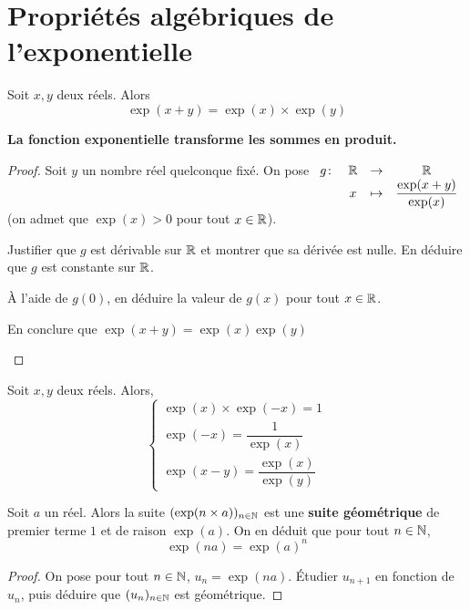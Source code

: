 \documentclass{poly}
\begin{document}
\section{Propriétés algébriques de l'exponentielle}
\begin{theorem}
Soit $x,y$ deux réels. Alors
\begin{equation*}
\exp(x + y) = \exp(x) \times \exp(y)
\end{equation*}
\end{theorem}
\begin{remark}
\textbf{La fonction exponentielle transforme les sommes en produit.}
\end{remark}
\begin{proof}
Soit $y$ un nombre réel quelconque fixé. On pose $\begin{array}[t]{lccc} g \colon &\mathbb{R} &\to& \mathbb{R}\\ & x &\mapsto& \dfrac{\exp(x + y)}{\exp(x)}\end{array}$ (on admet que $\exp(x) > 0$ pour tout $x \in \mathbb{R}$).
\begin{alphaquestions}
\item Justifier que $g$ est dérivable sur $\mathbb{R}$ et montrer que sa dérivée est nulle. En déduire que $g$ est constante sur $\mathbb{R}$.
\item À l'aide de $g(0)$, en déduire la valeur de $g(x)$ pour tout $x \in \mathbb{R}$.
\item En conclure que $\exp(x + y) = \exp(x)\exp(y)$
\end{alphaquestions}
\end{proof}
\begin{corollary}
Soit $x,y$ deux réels. Alors,
\begin{equation*}
\begin{cases}
\exp(x) \times \exp(-x) = 1\\
\exp(- x) = \dfrac{1}{\exp(x)}\\
\exp(x - y) = \dfrac{\exp(x)}{\exp(y)}
\end{cases}
\end{equation*}
\end{corollary}
\newpage
\begin{definition}
Soit $a$ un réel. Alors la suite $(\exp(n \times a))_{n \in \mathbb{N}}$ est une \textbf{suite géométrique} de premier terme $1$ et de raison $\exp(a)$. On en déduit que pour tout $n \in \mathbb{N}$,
\begin{equation*}
\exp(na) = \exp(a)^n
\end{equation*}
\end{definition}
\begin{proof}
On pose pour tout $n \in \mathbb{N}$, $u_n = \exp(na)$. Étudier $u_{n+1}$ en fonction de $u_n$, puis déduire que $(u_n)_{n \in \mathbb{N}}$ est géométrique.
\end{proof}
\end{document}
